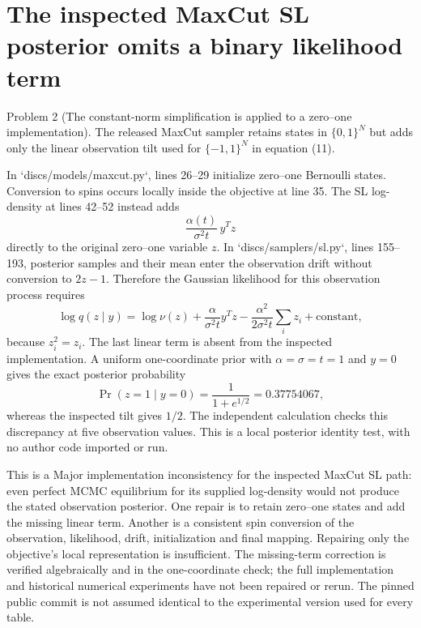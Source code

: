 \documentclass[10pt]{article}
\begin{document}
\section*{The inspected MaxCut SL posterior omits a binary likelihood term}
Problem 2 (The constant-norm simplification is applied to a zero–one implementation).  The released MaxCut sampler retains states in \(\{0,1\}^N\) but adds only the linear observation tilt used for \(\{-1,1\}^N\) in equation (11).\par
In `discs/models/maxcut.py`, lines 26–29 initialize zero–one Bernoulli states. Conversion to spins occurs locally inside the objective at line 35. The SL log-density at lines 42–52 instead adds \[\frac{\alpha(t)}{\sigma^2t}\,y^Tz\] directly to the original zero–one variable \(z\). In `discs/samplers/sl.py`, lines 155–193, posterior samples and their mean enter the observation drift without conversion to \(2z-1\). Therefore the Gaussian likelihood for this observation process requires \[\log q(z\mid y)=\log\nu(z)+\frac{\alpha}{\sigma^2t}y^Tz
 -\frac{\alpha^2}{2\sigma^2t}\sum_i z_i+\text{constant},\] because \(z_i^2=z_i\). The last linear term is absent from the inspected implementation. A uniform one-coordinate prior with \(\alpha=\sigma=t=1\) and \(y=0\) gives the exact posterior probability \[\Pr(z=1\mid y=0)=\frac1{1+e^{1/2}}=0.37754067,\] whereas the inspected tilt gives \(1/2\). The independent calculation checks this discrepancy at five observation values. This is a local posterior identity test, with no author code imported or run.\par
This is a Major implementation inconsistency for the inspected MaxCut SL path: even perfect MCMC equilibrium for its supplied log-density would not produce the stated observation posterior. One repair is to retain zero–one states and add the missing linear term. Another is a consistent spin conversion of the observation, likelihood, drift, initialization and final mapping. Repairing only the objective’s local representation is insufficient. The missing-term correction is verified algebraically and in the one-coordinate check; the full implementation and historical numerical experiments have not been repaired or rerun. The pinned public commit is not assumed identical to the experimental version used for every table.\par
\end{document}

